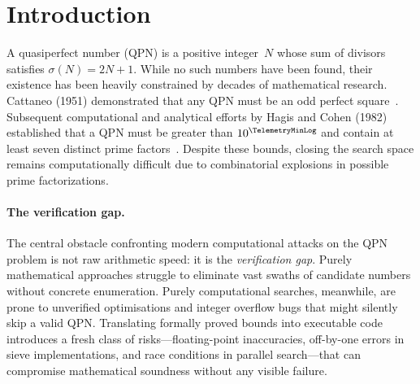 \section{Introduction}
\label{sec:intro}

A quasiperfect number (QPN) is a positive integer~$N$ whose sum of
divisors satisfies $\sigma(N) = 2N + 1$.  While no such numbers have
been found, their existence has been heavily constrained by decades of
mathematical research.  Cattaneo (1951) demonstrated that any QPN must
be an odd perfect square~\cite{cattaneo1951}.  Subsequent computational
and analytical efforts by Hagis and Cohen (1982) established that a QPN
must be greater than $10^{\TelemetryMinLog}$ and contain at least seven distinct prime
factors~\cite{hagis1982}.  Despite these bounds, closing the search
space remains computationally difficult due to combinatorial explosions
in possible prime factorizations.

\paragraph{The verification gap.}
The central obstacle confronting modern computational attacks on the QPN
problem is not raw arithmetic speed: it is the \emph{verification gap}.
Purely mathematical approaches struggle to eliminate vast swaths of
candidate numbers without concrete enumeration.  Purely computational
searches, meanwhile, are prone to unverified optimisations and integer
overflow bugs that might silently skip a valid QPN\@.  Translating
formally proved bounds into executable code introduces a fresh class of
risks---floating-point inaccuracies, off-by-one errors in sieve
implementations, and race conditions in parallel search---that can
compromise mathematical soundness without any visible failure.

